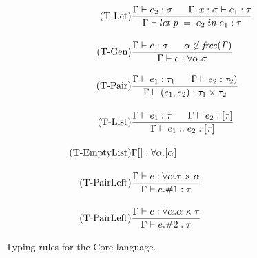 \begin{figure}[htb]
\begin{align*}
\tag{T-Let}
&\frac{\Gamma \vdash e_{2}:\sigma \;\;\;\;\;\; \Gamma, x:\sigma \vdash e_{1}:\tau}
{\Gamma \vdash let\;p\;=\;e_{2}\;in\;e_{1}:\tau}
\\[1em]
\tag{T-Gen}
&\frac{\Gamma \vdash e:\sigma \;\;\;\;\;\; \alpha \not\in \mathit{free(\Gamma)}}{\Gamma \vdash e : \forall \alpha . \sigma}
\\[1em]
\tag{T-Pair}
&\frac
{\Gamma \vdash e_{1}:\tau_{1} \;\;\;\;\;\; \Gamma \vdash e_{2}:\tau_{2})}
{\Gamma \vdash (e_{1},e_{2}):\tau_{1} \times \tau_{2}}
\\[1em]
\tag{T-List}
&\frac
{\Gamma \vdash e_{1}:\tau \;\;\;\;\;\; \Gamma \vdash e_{2}:[\tau]}
{\Gamma \vdash e_{1}::e_{2}:[\tau]}
\\[1em]
\tag{T-EmptyList}
&\Gamma [] : \forall \alpha.[\alpha]
\\[1em]
\tag{T-PairLeft}
&\frac
{\Gamma \vdash e:\forall \alpha . \tau \times \alpha}
{\Gamma \vdash e.\#1:\tau}
\\[1em]
\tag{T-PairLeft}
&\frac
{\Gamma \vdash e:\forall \alpha . \alpha \times \tau}
{\Gamma \vdash e.\#2:\tau}
\end{align*}
\caption{Typing rules for the Core language. \label{fig:TypeRulesCore}}
\end{figure}

